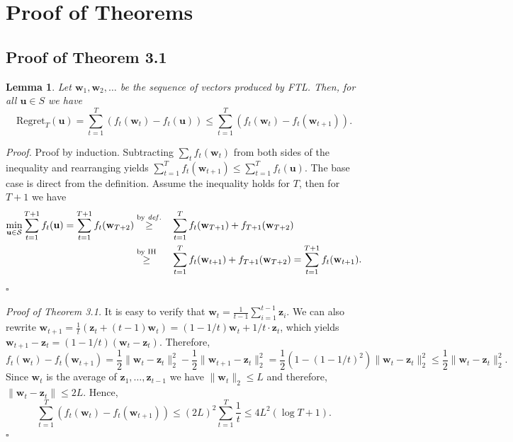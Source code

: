 \documentclass{article}
\newtheorem{lemma}{Lemma}
\newcommand*{\qed}{\null\nobreak\hfill\ensuremath{\square}}%
\begin{document}
\section{Proof of Theorems}

\subsection{Proof of Theorem 3.1}
\begin{lemma}
  Let $\textbf{w}_1, \textbf{w}_2, \ldots$ be the sequence of vectors produced by FTL. Then, for all $\textbf{u}\in S$ we have \[\text{Regret}_T(\textbf{u})=\sum\limits_{t=1}^T (f_t(\textbf{w}_t)-f_t(\textbf{u}))\leq \sum\limits_{t=1}^T (f_t(\textbf{w}_t)-f_t(\textbf{w}_{t+1})).\]
\end{lemma}

{\it Proof.} Proof by induction. Subtracting $\sum_t f_t(\textbf{w}_t)$ from both sides of the inequality and rearranging yields $\sum_{t=1}^T f_t(\textbf{w}_{t+1})\leq \sum_{t=1}^T f_t(\textbf{u})$. The base case is direct from the definition. Assume the inequality holds for $T$, then for $T+1$ we have \[\begin{aligned}\min\limits_{\textbf{u}\in\mathcal{S}}\sum\limits_{t=1}^{T+1} f_t(\textbf{u})=\sum\limits_{t=1}^{T+1} f_t(\textbf{w}_{T+2})&\overset{\text{by }{\it def.}}{\geq} &&\sum\limits_{t=1}^T f_t(\textbf{w}_{T+1})+f_{T+1}(\textbf{w}_{T+2})\\&\overset{\text{by IH}}{\geq} &&\sum\limits_{t=1}^T f_t(\textbf{w}_{t+1})+f_{T+1}(\textbf{w}_{T+2})=\sum\limits_{t=1}^{T+1} f_t(\textbf{w}_{t+1}).\end{aligned}\]\qed

{\it Proof of Theorem 3.1.} It is easy to verify that $\textbf{w}_t=\frac{1}{t-1}\sum_{i=1}^{t-1} \textbf{z}_i$.
We can also rewrite $\textbf{w}_{t+1}=\frac{1}{t}(\textbf{z}_t+(t-1)\textbf{w}_t)=(1-1/t)\textbf{w}_t+1/t\cdot\textbf{z}_t$, which yields $\textbf{w}_{t+1}-\textbf{z}_t=(1-1/t)(\textbf{w}_t-\textbf{z}_t)$.
Therefore, \[f_t(\textbf{w}_t)-f_t(\textbf{w}_{t+1})=\frac{1}{2}\lVert \textbf{w}_t-\textbf{z}_t\rVert^2_2-\frac{1}{2}\lVert \textbf{w}_{t+1}-\textbf{z}_t\rVert_2^2=\frac{1}{2}\left(1-\left(1-1/t\right)^2\right)\lVert\textbf{w}_t-\textbf{z}_t\rVert_2^2\leq \frac{1}{2}\lVert \textbf{w}_t-\textbf{z}_t\rVert_2^2.\]
Since $\textbf{w}_t$ is the average of $\textbf{z}_1, \ldots, \textbf{z}_{t-1}$ we have $\lVert \textbf{w}_t\rVert_2\leq L$ and therefore, $\lVert \textbf{w}_t-\textbf{z}_t\rVert\leq 2L.$
Hence, \[\sum\limits_{t=1}^T (f_t(\textbf{w}_t)-f_t(\textbf{w}_{t+1}))\leq (2L)^2 \sum\limits_{t=1}^T \frac{1}{t}\leq 4L^2(\log T+1).\]\qed
\end{document}
